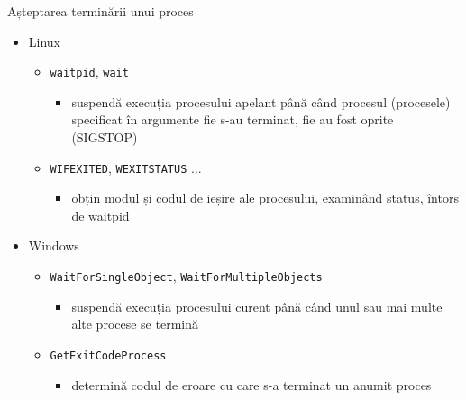 \documentclass{so.cs.pub.ro}
\begin{document}
\begin{frame}{Așteptarea terminării unui proces}
	\begin{itemize}
		\item Linux	
		\begin{itemize}
			\item \texttt{waitpid}, \texttt{wait}
			\begin{itemize}
				\item suspendă execuția procesului apelant până când procesul (procesele) specificat în argumente fie s-au terminat, fie au fost oprite (SIGSTOP)
			\end{itemize}			
			\item \texttt{WIFEXITED}, \texttt{WEXITSTATUS} ...
			\begin{itemize}
				\item obțin modul și codul de ieșire ale procesului, examinând status, întors de waitpid
			\end{itemize}
		\end{itemize}
		\vspace*{0.1cm}
		\item Windows
		\begin{itemize}
			\item \texttt{WaitForSingleObject}, \texttt{WaitForMultipleObjects}
			\begin{itemize}
				\item suspendă execuția procesului curent până când unul sau mai multe alte procese se termină
			\end{itemize}
			\item \texttt{GetExitCodeProcess}
			\begin{itemize}
				\item determină codul de eroare cu care s-a terminat un anumit proces
			\end{itemize}
		\end{itemize}
	\end{itemize}
\end{frame}
\end{document}

